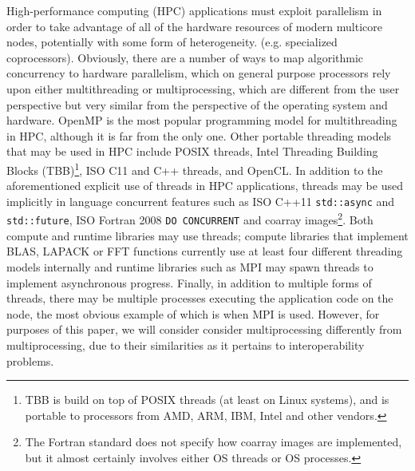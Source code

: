 High-performance computing (HPC) applications must exploit parallelism
in order to take advantage of all of the hardware resources of
modern multicore nodes, potentially with some form of heterogeneity.
(e.g. specialized coprocessors).
Obviously, there are a number of ways to map algorithmic concurrency
to hardware parallelism, which on general purpose processors rely
upon either multithreading or multiprocessing, which are different
from the user perspective but very similar from the perspective of
the operating system and hardware.
OpenMP is the most popular programming model for multithreading in HPC,
although it is far from the only one.
Other portable threading models that may be used in HPC include
POSIX threads,
Intel\regtm{} Threading Building Blocks (TBB)\footnote{TBB is build on top
of POSIX\othertm{} threads (at least on Linux\othertm{} systems), and is portable to
processors from AMD\othertm, ARM\othertm, IBM\othertm, Intel and other vendors.},
ISO\othertm{} C11 and C++ threads, and
OpenCL\othertm.
In addition to the aforementioned explicit use of threads in HPC applications,
threads may be used implicitly in language concurrent features such as
ISO C++11 \texttt{std::async} and \texttt{std::future},
ISO Fortran 2008 \texttt{DO CONCURRENT} and coarray images\footnote{
The Fortran standard does not specify how coarray images are implemented,
but it almost certainly involves either OS threads or OS processes.}.
Both compute and runtime libraries may use threads;
compute libraries that implement BLAS, LAPACK or FFT functions
currently use at least four different threading models internally and
runtime libraries such as MPI may spawn threads to implement asynchronous progress.
Finally, in addition to multiple forms of threads, there may be multiple
processes executing the application code on the node, the most obvious example
of which is when MPI is used.  However, for purposes of this paper, we will consider
consider multiprocessing differently from multiprocessing,
due to their similarities as it pertains to interoperability problems.

